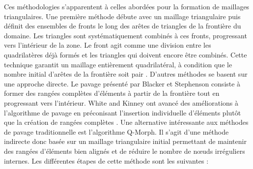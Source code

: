 Ces méthodologies s'apparentent à celles abordées pour la formation de maillages triangulaires. Une première méthode débute avec un maillage triangulaire puis définit des ensembles de fronts le long des arêtes de triangles de la frontière du domaine. Les triangles sont systématiquement combinés à ces fronts, progressant vers l'intérieur de la zone. Le front agit comme une division entre les quadrilatères déjà formés et les triangles qui doivent encore être combinés. Cette technique garantit un maillage entièrement quadrilatéral, à condition que le nombre initial d'arêtes de la frontière soit pair \cite{owen1999q}. D'autres méthodes se basent sur une approche directe. Le pavage présenté par Blacker et Stephenson \cite{blacker1991paving} consiste à former des rangées complètes d'éléments à partir de la frontière tout en progressant vers l'intérieur. White and Kinney ont avancé des améliorations à l'algorithme de pavage en préconisant l'insertion individuelle d'éléments plutôt que la création de rangées complètes \cite{white1997redesign}. Une alternative intéressante aux méthodes de pavage traditionnelle est l'algorithme Q-Morph. Il s'agit d'une méthode indirecte donc basée sur un maillage triangulaire initial permettant de maintenir des rangées d'éléments bien alignés et de réduire le nombre de nœuds irréguliers internes. Les différentes étapes de cette méthode sont les suivantes \cite{owen1999q}:\\

